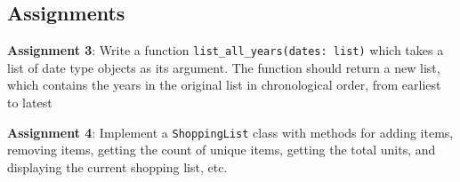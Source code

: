 \documentclass{article}
\begin{document}
\subsection{Assignments}
\textbf{Assignment 3}: Write a function \texttt{list\_all\_years(dates: list)} which takes a list of date type objects as its argument. The function should return a new list, which contains the years in the original list in chronological order, from earliest to latest

\textbf{Assignment 4}: Implement a \texttt{ShoppingList} class with methods for adding items, removing items, getting the count of unique items, getting the total units, and displaying the current shopping list, etc.
\end{document}
